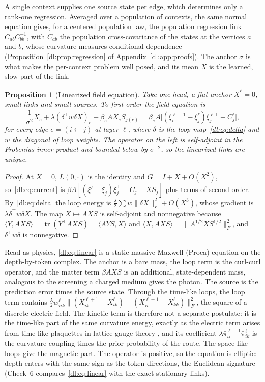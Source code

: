 \documentclass[11pt]{article}
\newtheorem{proposition}[theorem]{Proposition}
\theoremstyle{definition}
\theoremstyle{remark}
\providecommand{\tr}{\operatorname{tr}}
\begin{document}
A single context supplies one source state per edge, which determines only a rank-one regression. Averaged over a population of contexts, the same normal equation gives, for a centered population law, the population regression link $C_{ab}C_{bb}^{-1}$, with $C_{ab}$ the population cross-covariance of the states at the vertices $a$ and $b$, whose curvature measures conditional dependence (Proposition~\ref{dl:prop:regression} of Appendix~\ref{dl:app:proofs}). The anchor $\sigma$ is what makes the per-context problem well posed, and its mean $\bar X$ is the learned, slow part of the link.

\begin{proposition}[Linearized field equation]
\label{dl:prop:linear}
Take one head, a flat anchor $\bar X^\ell=0$, small links and small sources. To first order the field equation is
\begin{equation}
\frac1{\sigma^2}X_e+\lambda(\delta^\top w\delta X)_e+\beta_eAX_eS_{j(e)}
=\beta_eA\big[(\xi_i^{\ell+1}-\xi_j^\ell)\xi_j^{\ell\top}-C_j^\ell\big],
\label{dl:eq:linear}
\end{equation}
for every edge $e=(i\leftarrow j)$ at layer $\ell$, where $\delta$ is the loop map~\eqref{dl:eq:delta} and $w$ the diagonal of loop weights. The operator on the left is self-adjoint in the Frobenius inner product and bounded below by $\sigma^{-2}$, so the linearized links are unique.
\end{proposition}

\begin{proof}
At $X=0$, $L(0,\cdot)$ is the identity and $G=I+X+O(X^2)$, so~\eqref{dl:eq:current} is $\beta A[(\xi'-\xi_j)\xi_j^\top-C_j-XS_j]$ plus terms of second order. By~\eqref{dl:eq:delta} the loop energy is $\tfrac\lambda2\sum w\|\delta X\|_F^2+O(X^3)$, whose gradient is $\lambda\delta^\top w\delta X$. The map $X\mapsto AXS$ is self-adjoint and nonnegative because $\langle Y,AXS\rangle=\tr(Y^\top AXS)=\langle AYS,X\rangle$ and $\langle X,AXS\rangle=\|A^{1/2}XS^{1/2}\|_F^2$, and $\delta^\top w\delta$ is nonnegative.
\end{proof}

Read as physics, \eqref{dl:eq:linear} is a static massive Maxwell (Proca) equation on the depth-by-token complex. The anchor is a bare mass, the loop term is the curl-curl operator, and the matter term $\beta AXS$ is an additional, state-dependent mass, analogous to the screening a charged medium gives the photon. The source is the prediction error times the source state. Through the time-like loops, the loop term contains $\tfrac\lambda2w_{iik}^\ell\|(X_{ik}^{\ell+1}-X_{ik}^\ell)-(X_{ii}^{\ell+1}-X_{kk}^\ell)\|_F^2$, the square of a discrete electric field. The kinetic term is therefore not a separate postulate: it is the time-like part of the same curvature energy, exactly as the electric term arises from time-like plaquettes in lattice gauge theory \cite{dl:kogut1975}, and its coefficient $\lambda\bar\pi_{ii}^{\ell+1}\bar\pi_{ik}^\ell$ is the curvature coupling times the prior probability of the route. The space-like loops give the magnetic part. The operator is positive, so the equation is elliptic: depth enters with the same sign as the token directions, the Euclidean signature (Check~6 compares~\eqref{dl:eq:linear} with the exact stationary links).
\end{document}
